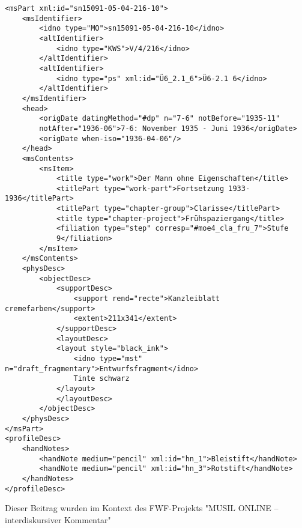 \documentclass{article}
\begin{document}
        \begin{verbatim}<msPart xml:id="sn15091-05-04-216-10">
    <msIdentifier>
        <idno type="MO">sn15091-05-04-216-10</idno>
        <altIdentifier>
            <idno type="KWS">V/4/216</idno>
        </altIdentifier>
        <altIdentifier>
            <idno type="ps" xml:id="Ü6_2.1_6">Ü6-2.1 6</idno>
        </altIdentifier>
    </msIdentifier>
    <head>
        <origDate datingMethod="#dp" n="7-6" notBefore="1935-11"
        notAfter="1936-06">7-6: November 1935 - Juni 1936</origDate>
        <origDate when-iso="1936-04-06"/>
    </head>
    <msContents>
        <msItem>
            <title type="work">Der Mann ohne Eigenschaften</title>
            <titlePart type="work-part">Fortsetzung 1933-1936</titlePart>
            <titlePart type="chapter-group">Clarisse</titlePart>
            <title type="chapter-project">Frühspaziergang</title>
            <filiation type="step" corresp="#moe4_cla_fru_7">Stufe
            9</filiation>
        </msItem>
    </msContents>
    <physDesc>
        <objectDesc>
            <supportDesc>
                <support rend="recte">Kanzleiblatt cremefarben</support>
                <extent>211x341</extent>
            </supportDesc>
            <layoutDesc>
            <layout style="black_ink">
                <idno type="mst" n="draft_fragmentary">Entwurfsfragment</idno>
                Tinte schwarz
            </layout>
            </layoutDesc>
        </objectDesc>
    </physDesc>
</msPart>
<profileDesc>
    <handNotes>
        <handNote medium="pencil" xml:id="hn_1">Bleistift</handNote>
        <handNote medium="pencil" xml:id="hn_3">Rotstift</handNote>
    </handNotes>
</profileDesc>\end{verbatim}Dieser Beitrag wurden im Kontext des FWF-Projekts "MUSIL ONLINE – interdiskursiver Kommentar" 
\end{document}
